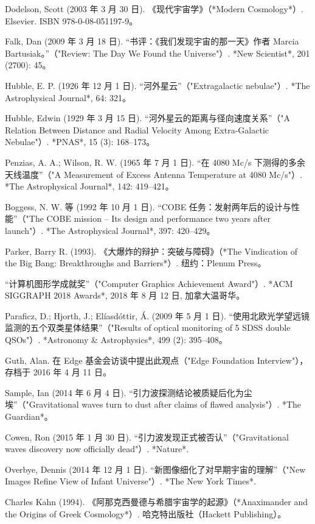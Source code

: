 \begin{enumerate}
Dodelson, Scott (2003 年 3 月 30 日). 《现代宇宙学》（*Modern Cosmology*）. Elsevier. ISBN 978-0-08-051197-9。  

Falk, Dan (2009 年 3 月 18 日). “书评：《我们发现宇宙的那一天》作者 Marcia Bartusiak。”（"Review: The Day We Found the Universe"）. *New Scientist*, 201 (2700): 45。  

Hubble, E. P. (1926 年 12 月 1 日). “河外星云”（"Extragalactic nebulae"）. *The Astrophysical Journal*, 64: 321。  

Hubble, Edwin (1929 年 3 月 15 日). “河外星云的距离与径向速度关系”（"A Relation Between Distance and Radial Velocity Among Extra-Galactic Nebulae"）. *PNAS*, 15 (3): 168–173。  

Penzias, A. A.; Wilson, R. W. (1965 年 7 月 1 日). “在 4080 Mc/s 下测得的多余天线温度”（"A Measurement of Excess Antenna Temperature at 4080 Mc/s"）. *The Astrophysical Journal*, 142: 419–421。  

Boggess, N. W. 等 (1992 年 10 月 1 日). “COBE 任务：发射两年后的设计与性能”（"The COBE mission – Its design and performance two years after launch"）. *The Astrophysical Journal*, 397: 420–429。  

Parker, Barry R. (1993). 《大爆炸的辩护：突破与障碍》（*The Vindication of the Big Bang: Breakthroughs and Barriers*）. 纽约：Plenum Press。  

“计算机图形学成就奖”（"Computer Graphics Achievement Award"）. *ACM SIGGRAPH 2018 Awards*, 2018 年 8 月 12 日, 加拿大温哥华。  

Paraficz, D.; Hjorth, J.; Elíasdóttir, Á. (2009 年 5 月 1 日). “使用北欧光学望远镜监测的五个双类星体结果”（"Results of optical monitoring of 5 SDSS double QSOs"）. *Astronomy & Astrophysics*, 499 (2): 395–408。  

Guth, Alan. 在 Edge 基金会访谈中提出此观点（"Edge Foundation Interview"），存档于 2016 年 4 月 11 日。  

Sample, Ian (2014 年 6 月 4 日). “引力波探测结论被质疑后化为尘埃”（"Gravitational waves turn to dust after claims of flawed analysis"）. *The Guardian*。  

Cowen, Ron (2015 年 1 月 30 日). “引力波发现正式被否认”（"Gravitational waves discovery now officially dead"）. *Nature*.  

Overbye, Dennis (2014 年 12 月 1 日). “新图像细化了对早期宇宙的理解”（"New Images Refine View of Infant Universe"）. *The New York Times*.  

Charles Kahn (1994). 《阿那克西曼德与希腊宇宙学的起源》（*Anaximander and the Origins of Greek Cosmology*）. 哈克特出版社（Hackett Publishing）。  


\end{enumerate}
